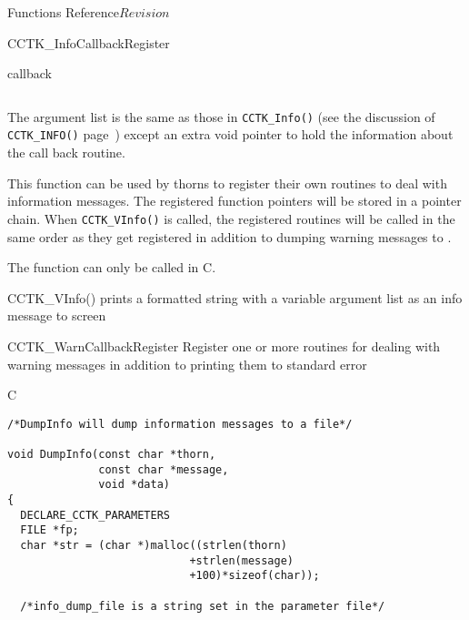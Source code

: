 \begin{cactuspart}{ Functions Reference}{}{$Revision$}
\begin{FunctionDescription}{CCTK\_InfoCallbackRegister}
\begin{ParameterSection}
\begin{Parameter}{callback}
\begin{verbatim}
\end{verbatim}

The argument list is the same as those in \verb|CCTK_Info()|
(see the discussion of \verb|CCTK_INFO()| page~\pageref{CCTK-INFO})
except an extra void pointer to hold the information about the call
back routine.

\end{Parameter}

\end{ParameterSection}

\begin{Discussion}

This function can be used by thorns to register their own routines to
deal with information messages. The registered function pointers will be
stored in a pointer chain. When \verb|CCTK_VInfo()| is called, the
registered routines will be called in the same order as they get
registered in addition to dumping warning messages to .

The function can only be called in C.

\end{Discussion}

\begin{SeeAlsoSection}
\begin{SeeAlso}{CCTK\_VInfo()}
prints a formatted string with a variable argument list as an info message to
screen
\end{SeeAlso}

\begin{SeeAlso}{CCTK\_WarnCallbackRegister}
Register one or more routines for dealing with warning messages in addition
to printing them to standard error
\end{SeeAlso}

\end{SeeAlsoSection}

\begin{ExampleSection}
\begin{Example}{C}
\begin{verbatim}
/*DumpInfo will dump information messages to a file*/

void DumpInfo(const char *thorn,
              const char *message,
              void *data)
{
  DECLARE_CCTK_PARAMETERS
  FILE *fp;
  char *str = (char *)malloc((strlen(thorn)
                            +strlen(message)
                            +100)*sizeof(char));

  /*info_dump_file is a string set in the parameter file*/


\end{verbatim}
\end{Example}
\end{ExampleSection}
\end{FunctionDescription}
\end{cactuspart}
